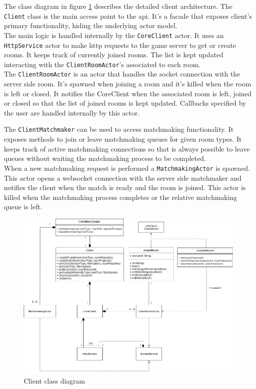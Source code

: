 The class diagram in figure \ref{fig:client_class_diagram} describes the detailed client architecture.
The \texttt{Client} class is the main access point to the api. It's a facade that exposes client's primary functionality, hiding the underlying actor model.  
\\
The main logic is handled internally by the \texttt{CoreClient} actor. It uses an \texttt{HttpService} actor to make http requests to the game server to get or create rooms. 
It keeps track of currently joined rooms. The list is kept updated interacting with the \texttt{ClientRoomActor}'s associated to each room.
\\
The \texttt{ClientRoomActor} is an actor that handles the socket connection with the server side room. 
It's spawned when joining a room and it's killed when the room is left or closed.  It notifies the CoreClient when the associated room is left, joined or closed so that the list of joined rooms is kept updated. 
Callbacks specified by the user are handled internally by this actor.

The \texttt{ClientMatchmaker} can be used to access matchmaking functionality. It exposes methods to join or leave matchmaking queues for given room types. It keeps track of active matchmaking connections so that is always possible to leave queues without waiting the matchmaking process to be completed.
\\
When a new matchmaking request is performed a \texttt{MatchmakingActor} is spawned. 
This actor opens a websocket connection with the server side matchmaker and notifies the client when the match is ready and the room is joined. This actor is killed when the matchmaking process completes or the relative matchmaking queue is left.

\begin{figure}
	\hspace*{-1 in}
	\includegraphics[scale=0.55]{images/4-design/client_class.png}
	\caption{Client class diagram}
	\label{fig:client_class_diagram}
\end{figure}

